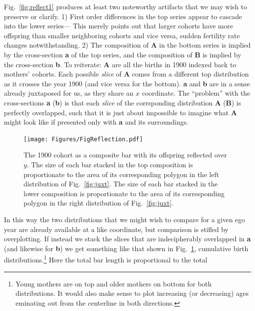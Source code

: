 \documentclass{article}
\begin{document}
Fig.~\ref{fig:reflect1} produces at least two noteworthy artifacts that we may wish to preserve or clarify. 1) First order differences in the top series appear to cascade into the lower series--- This merely points out that larger cohorts have more offspring than smaller neighboring cohorts and vice versa, sudden fertility rate changes notwithstanding. 2) The composition of \textbf{A} in the bottom series is implied by the cross-section \textbf{a} of the top series, and the composition of  \textbf{B} is implied by the cross-section \textbf{b}. To reiterate: \textbf{A} are all the births in 1900 indexed back to mothers' cohorts. Each possible \emph{slice} of \textbf{A} comes from a different top distribution as it crosses the year 1900 (and vice versa for the bottom). \textbf{a} and \textbf{b} are in a sense already juxtaposed for us, as they share an $x$ coordinate. The ``problem'' with the cross-sections \textbf{a} (\textbf{b}) is that each \emph{slice} of the corrsponding distribution \textbf{A} (\textbf{B}) is perfectly overlapped, such that it is just about impossible to imagine what \textbf{A} might look like if presented only with \textbf{a} and its surroundings. 
\pagebreak
\begin{figure}
 \centering
        \texttt{[image: Figures/FigReflection.pdf]}
        \caption{The 1900 cohort as a composite bar with its offspring reflected over $y$. The size of each bar stacked in the top composition is proportionate to the area of its corresponding polygon in the left distribution of Fig.~\ref{fig:juxt}. The size of each bar stacked in the lower composition is proportionate to the area of its corresponding polygon in the right distribution of Fig.~\ref{fig:juxt}.}
          \label{fig:refl}
\end{figure}
In this way the two distributions that we might wish to compare for a given ego
year are already available at a like coordinate, but comparison is stifled by
overplotting. If instead we stack the slices that are indecipherably overlapped
in \textbf{a} (and likewise for \textbf{b}) we get something like that shown in
Fig.~\ref{fig:refl}, cumulative birth distributions.\footnote{Young mothers are
on top and older mothers on bottom for both distributions. It would also make
sense to plot increasing (or decreasing) ages eminating out from the centerline
in both directions.} Here the total bar length is proportional to the total
\end{document}
